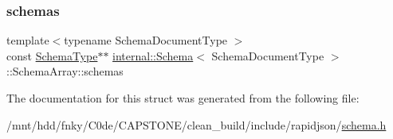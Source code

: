 \mbox{\label{structinternal_1_1Schema_1_1SchemaArray_a5b25dcc899a43aec06270dfefca2c742}} 
\subsubsection{\texorpdfstring{schemas}{schemas}}
{\footnotesize\ttfamily template$<$typename Schema\+Document\+Type $>$ \\
const \hyperlink{classinternal_1_1Schema_ac2556ebf7a7db971e1c1c0f76eb5786e}{Schema\+Type}$\ast$$\ast$ \hyperlink{classinternal_1_1Schema}{internal\+::\+Schema}$<$ Schema\+Document\+Type $>$\+::Schema\+Array\+::schemas}



The documentation for this struct was generated from the following file\+:\begin{DoxyCompactItemize}
\item 
/mnt/hdd/fnky/\+C0de/\+C\+A\+P\+S\+T\+O\+N\+E/clean\+\_\+build/include/rapidjson/\hyperlink{schema_8h}{schema.\+h}\end{DoxyCompactItemize}
